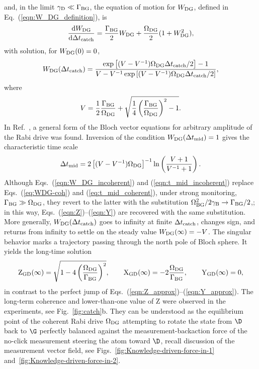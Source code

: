 and, in the limit $\gamma_{{\rm D}}\ll\Gamma_{{\rm BG}}$, the equation
of motion for $W_{{\rm DG}}$, defined in Eq.~(\ref{eqn:W_DG_definition}),
is
\begin{equation}
\frac{\mathrm{d}W_{{\rm DG}}}{\mathrm{d}\Delta t_{{\rm catch}}}=\frac{\Gamma_{{\rm BG}}}{2}W_{{\rm DG}}+\frac{\Omega_{{\rm DG}}}{2}(1+W_{{\rm DG}}^{2}),\label{eqn:W_DG_equation_incoherent}
\end{equation}
with solution, for $W_{{\rm DG}}(0)=0$, 
\begin{equation}
W_{{\rm DG}}(\Delta t_{{\rm catch}})=\frac{\exp\left[(V-V^{-1})\Omega_{{\rm DG}}\Delta t_{{\rm catch}}/2\right]-1}{V-V^{-1}\exp\left[(V-V^{-1})\Omega_{{\rm DG}}\Delta t_{{\rm catch}}/2\right]},\label{eqn:W_DG_incoherent}
\end{equation}
where 
\begin{equation}
V=\frac{1}{2}\frac{\Gamma_{{\rm BG}}}{\Omega_{{\rm DG}}}+\sqrt{\frac{1}{4}\left(\frac{\Gamma_{{\rm BG}}}{\Omega_{{\rm DG}}}\right)^{2}-1}.
\end{equation}
In Ref.~\citet{Ruskov2007}, a general form of the Bloch vector equations
for arbitrary amplitude of the Rabi drive was found. Inversion of
the condition $W_{{\rm DG}}(\Delta t_{{\rm mid}})=1$ gives the characteristic
time scale 
\begin{equation}
\Delta t_{{\rm mid}}=2\left[(V-V^{-1})\Omega_{{\rm DG}}\right]^{-1}\ln\left(\frac{V+1}{V^{-1}+1}\right).\label{eqn:t_mid_incoherent}
\end{equation}
Although Eqs.~(\ref{eqn:W_DG_incoherent}) and (\ref{eqn:t_mid_incoherent})
replace Eqs.~(\ref{eq:WDG-coh}) and (\ref{eq:t_mid_coherent}),
under strong monitoring, $\Gamma_{{\rm BG}}\gg\Omega_{{\rm DG}}$,
they revert to the latter with the substitution $\Omega_{{\rm BG}}^{2}/2\gamma_{{\rm B}}\to\Gamma_{{\rm BG}}/2$,;
in this way, Eqs.~(\ref{eqn:Z})–(\ref{eqn:Y}) are recovered with
the same substitution. More generally, $W_{{\rm DG}}(\Delta t_{{\rm catch}})$
goes to infinity at finite $\Delta t_{{\rm catch}}$, changes sign,
and returns from infinity to settle on the steady value $W_{{\rm DG}}(\infty)=-V$.
The singular behavior marks a trajectory passing through the north
pole of Bloch sphere. It yields the long-time solution 
\begin{equation}
{\rm Z}_{{\rm GD}}(\infty)=\sqrt{1-4\left(\frac{\Omega_{{\rm DG}}}{\Gamma_{{\rm BG}}}\right)^{2}},\qquad{\rm X}_{{\rm GD}}(\infty)=-2\frac{\Omega_{{\rm DG}}}{\Gamma_{{\rm BG}}},\qquad{\rm Y}_{{\rm GD}}(\infty)=0,\label{eq:ZGDXGD-long-term}
\end{equation}
in contrast to the perfect jump of Eqs.~(\ref{eqn:Z_approx})–(\ref{eqn:Y_approx}).
The long-term coherence and lower-than-one value of Z were observed
in the experiments, see Fig.~\ref{fig:catch}b. They can be understood
as the equilibrium point of the coherent Rabi drive $\Omega_{{\rm DG}}$
attempting to rotate the state from $\D$ back to $\G$ perfectly
balanced against the measurement-backaction force of the no-click
measurement steering the atom toward $\D$, recall discussion of the
measurement vector field, see Figs.~\ref{fig:Knowledge-driven-force-in-1}
and~\ref{fig:Knowledge-driven-force-in-2}. 

